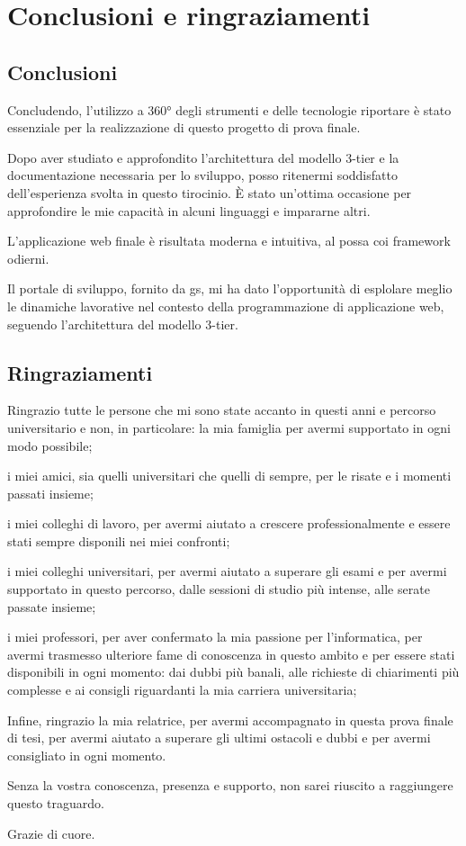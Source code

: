\chapter{Conclusioni e ringraziamenti}\label{ch:conclusioni}
\section{Conclusioni}\label{sec:conclusioni}
Concludendo, l'utilizzo a 360° degli strumenti e delle tecnologie riportare è stato essenziale per la realizzazione di questo progetto di prova finale. 

Dopo aver studiato e approfondito l'architettura del modello 3-tier e la documentazione necessaria per lo sviluppo, posso ritenermi soddisfatto dell'esperienza svolta in questo tirocinio. È stato un'ottima occasione per approfondire le mie capacità in alcuni linguaggi e impararne altri.

L'applicazione web finale è risultata moderna e intuitiva, al possa coi framework odierni.

Il portale di sviluppo, fornito da \acrlong{gs}, mi ha dato l'opportunità di esplolare meglio le dinamiche lavorative nel contesto della programmazione di applicazione web, seguendo l'architettura del modello 3-tier.


\section{Ringraziamenti}\label{sec:ringraziamenti}
Ringrazio tutte le persone che mi sono state accanto in questi anni e percorso universitario e non, in particolare: la mia famiglia per avermi supportato in ogni modo possibile;

i miei amici, sia quelli universitari che quelli di sempre, per le risate e i momenti passati insieme;

i miei colleghi di lavoro, per avermi aiutato a crescere professionalmente e essere stati sempre disponili nei miei confronti;

i miei colleghi universitari, per avermi aiutato a superare gli esami e per avermi supportato in questo percorso, dalle sessioni di studio più intense, alle serate passate insieme;

i miei professori, per aver confermato la mia passione per l'informatica, per avermi trasmesso ulteriore fame di conoscenza in questo ambito e per essere stati disponibili in ogni momento: dai dubbi più banali, alle richieste di chiarimenti più complesse e ai consigli riguardanti la mia carriera universitaria;

Infine, ringrazio la mia relatrice, per avermi accompagnato in questa prova finale di tesi, per avermi aiutato a superare gli ultimi ostacoli e dubbi e per avermi consigliato in ogni momento. 

Senza la vostra conoscenza, presenza e supporto, non sarei riuscito a raggiungere questo traguardo. 

Grazie di cuore.